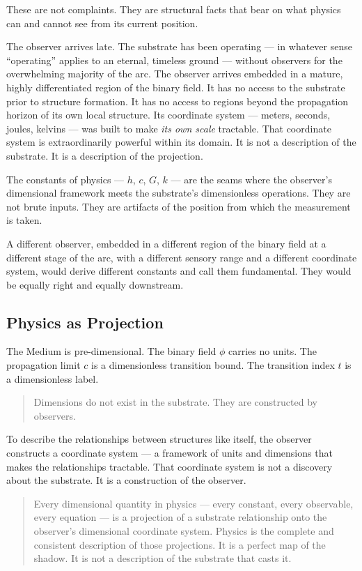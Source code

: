 \documentclass[11pt,letterpaper]{article}
\begin{document}
These are not complaints. They are structural facts that bear on what physics can and cannot see from its current position.

The observer arrives late. The substrate has been operating --- in whatever sense ``operating'' applies to an eternal, timeless ground --- without observers for the overwhelming majority of the arc. The observer arrives embedded in a mature, highly differentiated region of the binary field. It has no access to the substrate prior to structure formation. It has no access to regions beyond the propagation horizon of its own local structure. Its coordinate system --- meters, seconds, joules, kelvins --- was built to make \emph{its own scale} tractable. That coordinate system is extraordinarily powerful within its domain. It is not a description of the substrate. It is a description of the projection.

The constants of physics --- \(h\), \(c\), \(G\), \(k\) --- are the seams where the observer's dimensional framework meets the substrate's dimensionless operations. They are not brute inputs. They are artifacts of the position from which the measurement is taken.

A different observer, embedded in a different region of the binary field at a different stage of the arc, with a different sensory range and a different coordinate system, would derive different constants and call them fundamental. They would be equally right and equally downstream.
\subsection{Physics as Projection}
\label{sec:orgf8041ef}

The Medium is pre-dimensional. The binary field \(\phi\) carries no units. The propagation limit \(c\) is a dimensionless transition bound. The transition index \(t\) is a dimensionless label.

\begin{quote}
Dimensions do not exist in the substrate. They are constructed by observers.
\end{quote}

To describe the relationships between structures like itself, the observer constructs a coordinate system --- a framework of units and dimensions that makes the relationships tractable. That coordinate system is not a discovery about the substrate. It is a construction of the observer.

\begin{quote}
Every dimensional quantity in physics --- every constant, every observable, every equation --- is a projection of a substrate relationship onto the observer's dimensional coordinate system. Physics is the complete and consistent description of those projections. It is a perfect map of the shadow. It is not a description of the substrate that casts it.
\end{quote}
\newpage
\end{document}

